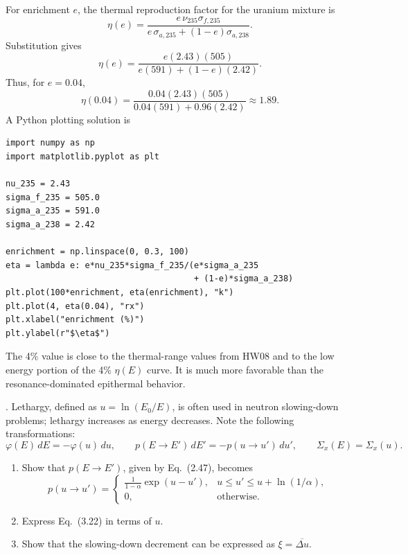 \begin{adaptedsolution}
For enrichment $e$, the thermal reproduction factor for the uranium mixture is
\[
 \eta(e)
 =\frac{e\,\nu_{235}\sigma_{f,235}}
        {e\,\sigma_{a,235}+(1-e)\sigma_{a,238}}.
\]
Substitution gives
\[
 \eta(e)=
 \frac{e(2.43)(505)}
      {e(591)+(1-e)(2.42)}.
\]
Thus, for $e=0.04$,
\[
 \eta(0.04)
 =\frac{0.04(2.43)(505)}
      {0.04(591)+0.96(2.42)}
 \approx \boxed{1.89}.
\]
A Python plotting solution is
\begin{verbatim}
import numpy as np
import matplotlib.pyplot as plt

nu_235 = 2.43
sigma_f_235 = 505.0
sigma_a_235 = 591.0
sigma_a_238 = 2.42

enrichment = np.linspace(0, 0.3, 100)
eta = lambda e: e*nu_235*sigma_f_235/(e*sigma_a_235
                                      + (1-e)*sigma_a_238)
plt.plot(100*enrichment, eta(enrichment), "k")
plt.plot(4, eta(0.04), "rx")
plt.xlabel("enrichment (%)")
plt.ylabel(r"$\eta$")
\end{verbatim}
The 4\% value is close to the thermal-range values from HW08 and to the low
energy portion of the 4\% $\eta(E)$ curve.  It is much more favorable than the
resonance-dominated epithermal behavior.
\end{adaptedsolution}

\newpage

. Lethargy, defined as $u=\ln(E_0/E)$, is often used
in neutron slowing-down problems; lethargy increases as energy decreases. Note
the following transformations:
\[
 \varphi(E)\,dE=-\varphi(u)\,du,\qquad
 p(E\to E')\,dE'=-p(u\to u')\,du',\qquad
 \Sigma_x(E)=\Sigma_x(u).
\]
\begin{enumerate}[label=(\alph*)]
\item Show that $p(E\to E')$, given by Eq.~(2.47), becomes
\[
p(u\to u')=
\begin{cases}
\displaystyle\frac{1}{1-\alpha}\exp(u-u'),
  & u\le u'\le u+\ln(1/\alpha),\\
0, & \text{otherwise}.
\end{cases}
\]
\item Express Eq.~(3.22) in terms of $u$.
\item Show that the slowing-down decrement can be expressed as
$\xi=\overline{\Delta u}$.
\end{enumerate}

